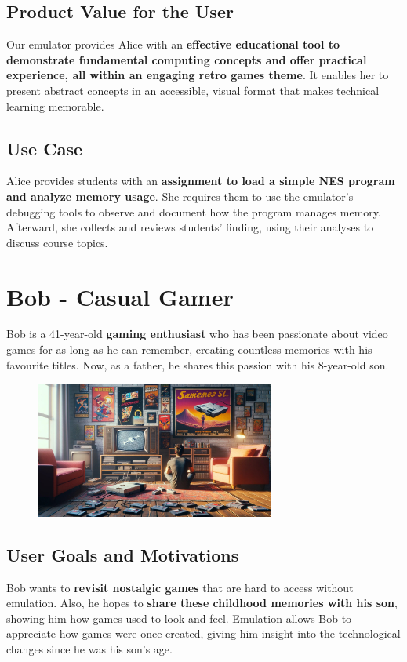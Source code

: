 \documentclass[a4paper, 11pt]{article}
\begin{document}
\subsection{Product Value for the User}
Our emulator provides Alice with an \textbf{effective educational tool to demonstrate fundamental computing concepts and offer practical experience, all within an engaging retro games theme}. It enables her to present abstract concepts in an accessible, visual format that makes technical learning memorable.

\subsection{Use Case}
Alice provides students with an \textbf{assignment to load a simple NES program and analyze memory usage}. She requires them to use the emulator's debugging tools to observe and document how the program manages memory. Afterward, she collects and reviews students' finding, using their analyses to discuss course topics.

\section{Bob - Casual Gamer}
Bob is a 41-year-old \textbf{gaming enthusiast} who has been passionate about video games for as long as he can remember, creating countless memories with his favourite titles. Now, as a father, he shares this passion with his 8-year-old son.

\begin{figure}[h]
    \centering
    \includegraphics[width=0.7\textwidth]{vintage-console.jpg}
\end{figure}

\subsection{User Goals and Motivations}
Bob wants to \textbf{revisit nostalgic games} that are hard to access without emulation. Also, he hopes to \textbf{share these childhood memories with his son}, showing him how games used to look and feel. Emulation allows Bob to appreciate how games were once created, giving him insight into the technological changes since he was his son's age.
\end{document}
